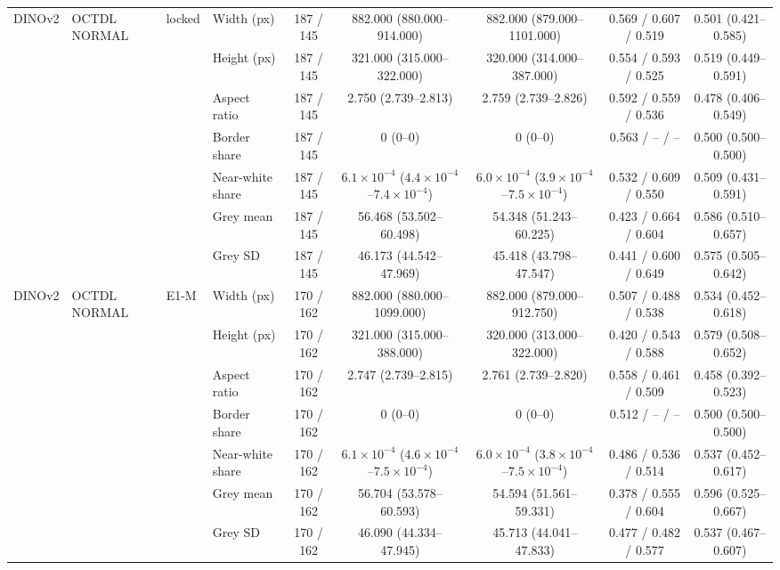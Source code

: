 \begin{longtable}{@{}llllccccc@{}}
\addlinespace[1pt]
DINOv2 & OCTDL NORMAL & locked & Width (px) & 187 / 145 & 882.000 (880.000--914.000) & 882.000 (879.000--1101.000) & 0.569 / 0.607 / 0.519 & 0.501 (0.421--0.585) \\
 &  &  & Height (px) & 187 / 145 & 321.000 (315.000--322.000) & 320.000 (314.000--387.000) & 0.554 / 0.593 / 0.525 & 0.519 (0.449--0.591) \\
 &  &  & Aspect ratio & 187 / 145 & 2.750 (2.739--2.813) & 2.759 (2.739--2.826) & 0.592 / 0.559 / 0.536 & 0.478 (0.406--0.549) \\
 &  &  & Border share & 187 / 145 & 0 (0--0) & 0 (0--0) & 0.563 / -- / -- & 0.500 (0.500--0.500) \\
 &  &  & Near-white share & 187 / 145 & $6.1\times10^{-4}$ ($4.4\times10^{-4}$--$7.4\times10^{-4}$) & $6.0\times10^{-4}$ ($3.9\times10^{-4}$--$7.5\times10^{-4}$) & 0.532 / 0.609 / 0.550 & 0.509 (0.431--0.591) \\
 &  &  & Grey mean & 187 / 145 & 56.468 (53.502--60.498) & 54.348 (51.243--60.225) & 0.423 / 0.664 / 0.604 & 0.586 (0.510--0.657) \\
 &  &  & Grey SD & 187 / 145 & 46.173 (44.542--47.969) & 45.418 (43.798--47.547) & 0.441 / 0.600 / 0.649 & 0.575 (0.505--0.642) \\
\addlinespace[1pt]
DINOv2 & OCTDL NORMAL & E1-M & Width (px) & 170 / 162 & 882.000 (880.000--1099.000) & 882.000 (879.000--912.750) & 0.507 / 0.488 / 0.538 & 0.534 (0.452--0.618) \\
 &  &  & Height (px) & 170 / 162 & 321.000 (315.000--388.000) & 320.000 (313.000--322.000) & 0.420 / 0.543 / 0.588 & 0.579 (0.508--0.652) \\
 &  &  & Aspect ratio & 170 / 162 & 2.747 (2.739--2.815) & 2.761 (2.739--2.820) & 0.558 / 0.461 / 0.509 & 0.458 (0.392--0.523) \\
 &  &  & Border share & 170 / 162 & 0 (0--0) & 0 (0--0) & 0.512 / -- / -- & 0.500 (0.500--0.500) \\
 &  &  & Near-white share & 170 / 162 & $6.1\times10^{-4}$ ($4.6\times10^{-4}$--$7.5\times10^{-4}$) & $6.0\times10^{-4}$ ($3.8\times10^{-4}$--$7.5\times10^{-4}$) & 0.486 / 0.536 / 0.514 & 0.537 (0.452--0.617) \\
 &  &  & Grey mean & 170 / 162 & 56.704 (53.578--60.593) & 54.594 (51.561--59.331) & 0.378 / 0.555 / 0.604 & 0.596 (0.525--0.667) \\
 &  &  & Grey SD & 170 / 162 & 46.090 (44.334--47.945) & 45.713 (44.041--47.833) & 0.477 / 0.482 / 0.577 & 0.537 (0.467--0.607) \\

\end{longtable}
